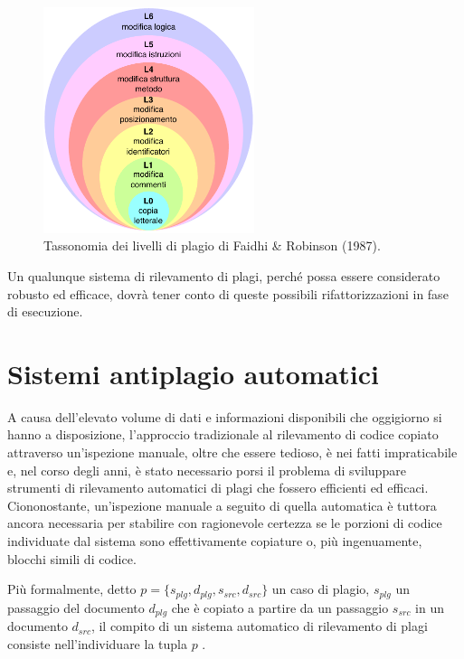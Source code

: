 \begin{figure}[h]
    \centering
    \includegraphics[width=0.55\textwidth]{resources/img/01-levels-of-plagiarism.pdf}
    \caption{Tassonomia dei livelli di plagio di Faidhi \& Robinson (1987).}
    \label{img:01-levels-of-plagiarism}
\end{figure}

Un qualunque sistema di rilevamento di plagi, perché possa essere considerato robusto ed efficace, dovrà tener conto di queste possibili rifattorizzazioni in fase di esecuzione.

\section{Sistemi antiplagio automatici}
\label{01:automatic-plagiarism-detector}
A causa dell'elevato volume di dati e informazioni disponibili che oggigiorno si hanno a disposizione, l'approccio tradizionale al rilevamento di codice copiato attraverso un'ispezione manuale, oltre che essere tedioso, è nei fatti impraticabile e, nel corso degli anni, è stato necessario porsi il problema di sviluppare strumenti di rilevamento automatici di plagi che fossero efficienti ed efficaci.
%
Ciononostante, un'ispezione manuale a seguito di quella automatica è tuttora ancora necessaria per stabilire con ragionevole certezza se le porzioni di codice individuate dal sistema sono effettivamente copiature o, più ingenuamente, blocchi simili di codice.

Più formalmente, detto $p = \{s_{plg}, d_{plg}, s_{src}, d_{src}\}$ un caso di plagio, $s_{plg}$ un passaggio del documento $d_{plg}$ che è copiato a partire da un passaggio $s_{src}$ in un documento $d_{src}$, il compito di un sistema automatico di rilevamento di plagi consiste nell'individuare la tupla $p$ \cite{yalcin-et-al-2022}.

